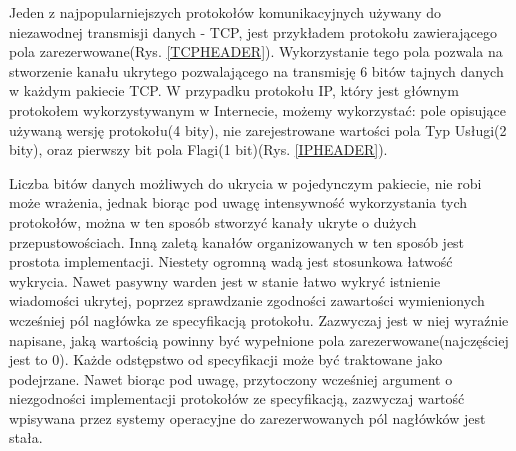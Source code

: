 \documentclass[a4paper, twoside]{report}
\begin{document}
        Jeden z najpopularniejszych protokołów komunikacyjnych używany do niezawodnej
        transmisji danych - TCP, jest przykładem protokołu zawierającego pola zarezerwowane(Rys. \ref{TCPHEADER}).
        Wykorzystanie tego pola pozwala na stworzenie kanału ukrytego pozwalającego
        na transmisję 6 bitów tajnych danych w każdym pakiecie TCP. W przypadku protokołu
        IP, który jest głównym protokołem wykorzystywanym w Internecie, możemy wykorzystać: pole
        opisujące używaną wersję protokołu(4 bity), nie zarejestrowane wartości pola Typ Usługi(2 bity),
        oraz pierwszy bit pola Flagi(1 bit)(Rys. \ref{IPHEADER})\cite{IPRFC}.

        Liczba bitów danych
        możliwych do ukrycia w pojedynczym pakiecie, nie robi może wrażenia, jednak biorąc
        pod uwagę intensywność wykorzystania tych protokołów, można w ten sposób
        stworzyć kanały ukryte o dużych przepustowościach. Inną zaletą kanałów organizowanych
        w ten sposób jest prostota implementacji. Niestety ogromną wadą jest stosunkowa
        łatwość wykrycia. Nawet pasywny warden jest w stanie łatwo wykryć istnienie wiadomości
        ukrytej, poprzez sprawdzanie zgodności zawartości wymienionych wcześniej pól
        nagłówka ze specyfikacją protokołu. Zazwyczaj jest w niej wyraźnie napisane,
        jaką wartością powinny być wypełnione pola zarezerwowane(najczęściej jest to 0).
        Każde odstępstwo od specyfikacji może być traktowane jako podejrzane. Nawet biorąc
        pod uwagę, przytoczony wcześniej argument o niezgodności implementacji protokołów
        ze specyfikacją, zazwyczaj wartość wpisywana przez systemy operacyjne do
        zarezerwowanych pól nagłówków jest stała.
\end{document}
